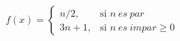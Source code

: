 \documentclass[preview]{standalone}
\begin{document}
\begin{align*}
f(x) = \begin{cases} n/2, & \text{si } n \ es \ par \\ 3n+1, & \text{si } n \ es \ impar \geq 0 \end{cases}
\end{align*}
\end{document}

